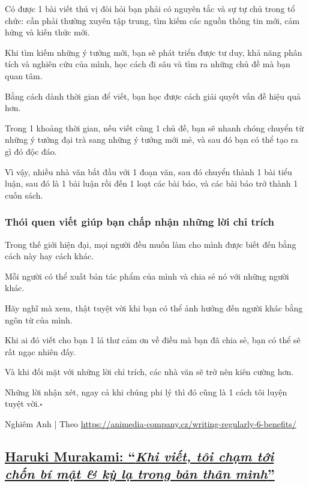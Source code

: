 \documentclass{article}
\begin{document}
Có được 1 bài viết thú vị đòi hỏi bạn phải có nguyên tắc và sự tự chủ trong tổ chức: cần phải thường xuyên tập trung, tìm kiếm các nguồn thông tin mới, cảm hứng và kiến thức mới.

%
Khi tìm kiếm những ý tưởng mới, bạn sẽ phát triển được tư duy, khả năng phân tích và nghiên cứu của mình, học cách đi sâu và tìm ra những chủ đề mà bạn quan tâm.

Bằng cách dành thời gian để viết, bạn học được cách giải quyết vấn đề hiệu quả hơn.

%
Trong 1 khoảng thời gian, nếu viết cùng 1 chủ đề, bạn sẽ nhanh chóng chuyển từ những ý tưởng đại trà sang những ý tưởng mới mẻ, và sau đó bạn có thể tạo ra gì đó độc đáo.

Vì vậy, nhiều nhà văn bắt đầu với 1 đoạn văn, sau đó chuyển thành 1 bài tiểu luận, sau đó là 1 bài luận rồi đến 1 loạt các bài báo, và các bài báo trở thành 1 cuốn sách.

\subsubsection{Thói quen viết giúp bạn chấp nhận những lời chỉ trích}
Trong thế giới hiện đại, mọi người đều muốn làm cho mình được biết đến bằng cách này hay cách khác.

Mỗi người có thể xuất bản tác phẩm của mình và chia sẻ nó với những người khác.

%
Hãy nghĩ mà xem, thật tuyệt vời khi bạn có thể ảnh hưởng đến người khác bằng ngôn từ của mình.

Khi ai đó viết cho bạn 1 lá thư cảm ơn về điều mà bạn đã chia sẻ, bạn có thể sẽ rất ngạc nhiên đấy.

%
Và khi đối mặt với những lời chỉ trích, các nhà văn sẽ trở nên kiên cường hơn.

Những lời nhận xét, ngay cả khi chúng phi lý thì đó cũng là 1 cách tôi luyện tuyệt vời.\hfill$\square$

\begin{flushright}
	Nghiêm Anh | Theo \url{https://animedia-company.cz/writing-regularly-6-benefits/}
\end{flushright}


\subsection{\href{http://tramdoc.vn/tin-tuc/haruki-murakami-khi-viet-toi-cham-toi-chon-bi-mat-va-ki-la-trong-ban-than-minh-nZNYLW.html}{Haruki Murakami: ``\textit{Khi viết, tôi chạm tới chốn bí mật \& kỳ lạ trong bản thân mình}''}}
\end{document}
